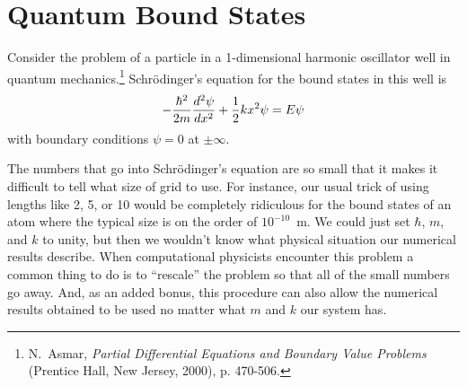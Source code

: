 \chapter{Quantum Bound States}
\label{Lab:13} 



Consider the problem of a particle in a 1-dimensional harmonic
oscillator well in quantum mechanics.\footnote{N.\ Asmar, {\it
Partial Differential Equations and Boundary Value Problems}
(Prentice Hall, New Jersey, 2000), p. 470-506.} Schr\"{o}dinger's
equation for the bound states in this well is
\begin{equation}
    - {\hbar^2 \over 2 m} {d^2 \psi \over dx^2} + {1 \over 2}  k x^2 \psi =
    E \psi
\end{equation}
with boundary conditions $\psi=0$ at $\pm \infty$.

The numbers that go into Schr\"{o}dinger's equation are so small
that it makes it difficult to tell what size of grid to use. For
instance, our usual trick of using lengths like 2, 5, or 10 would be
completely ridiculous for the bound states of an atom where the
typical size is on the order of $10^{-10}$~m. We could just set
$\hbar$, $m$, and $k$ to unity, but then we wouldn't know what
physical situation our numerical results describe. When
computational physicists encounter this problem a common thing to do
is to ``rescale'' the problem so that all of the small numbers go
away. And, as an added bonus, this procedure can also allow the
numerical results obtained to be used no matter what $m$ and $k$ our
system has.

